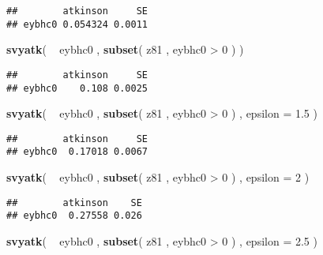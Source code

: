 \documentclass[]{book}
\newenvironment{Shaded}{\begin{snugshade}}{\end{snugshade}}
\newcommand{\KeywordTok}[1]{\textcolor[rgb]{0.13,0.29,0.53}{\textbf{{#1}}}}
\newcommand{\DataTypeTok}[1]{\textcolor[rgb]{0.13,0.29,0.53}{{#1}}}
\newcommand{\DecValTok}[1]{\textcolor[rgb]{0.00,0.00,0.81}{{#1}}}
\newcommand{\FloatTok}[1]{\textcolor[rgb]{0.00,0.00,0.81}{{#1}}}
\newcommand{\StringTok}[1]{\textcolor[rgb]{0.31,0.60,0.02}{{#1}}}
\newcommand{\NormalTok}[1]{{#1}}
\theoremstyle{definition}
\theoremstyle{definition}
\theoremstyle{remark}
\begin{document}
\begin{verbatim}
##        atkinson     SE
## eybhc0 0.054324 0.0011
\end{verbatim}

\begin{Shaded}
\begin{Highlighting}[]
\KeywordTok{svyatk}\NormalTok{( ~}\StringTok{ }\NormalTok{eybhc0 , }\KeywordTok{subset}\NormalTok{( z81 , eybhc0 >}\StringTok{ }\DecValTok{0} \NormalTok{) )}
\end{Highlighting}
\end{Shaded}

\begin{verbatim}
##        atkinson     SE
## eybhc0    0.108 0.0025
\end{verbatim}

\begin{Shaded}
\begin{Highlighting}[]
\KeywordTok{svyatk}\NormalTok{( ~}\StringTok{ }\NormalTok{eybhc0 , }\KeywordTok{subset}\NormalTok{( z81 , eybhc0 >}\StringTok{ }\DecValTok{0} \NormalTok{) , }\DataTypeTok{epsilon =} \FloatTok{1.5} \NormalTok{)}
\end{Highlighting}
\end{Shaded}

\begin{verbatim}
##        atkinson     SE
## eybhc0  0.17018 0.0067
\end{verbatim}

\begin{Shaded}
\begin{Highlighting}[]
\KeywordTok{svyatk}\NormalTok{( ~}\StringTok{ }\NormalTok{eybhc0 , }\KeywordTok{subset}\NormalTok{( z81 , eybhc0 >}\StringTok{ }\DecValTok{0} \NormalTok{) , }\DataTypeTok{epsilon =} \DecValTok{2} \NormalTok{)}
\end{Highlighting}
\end{Shaded}

\begin{verbatim}
##        atkinson    SE
## eybhc0  0.27558 0.026
\end{verbatim}

\begin{Shaded}
\begin{Highlighting}[]
\KeywordTok{svyatk}\NormalTok{( ~}\StringTok{ }\NormalTok{eybhc0 , }\KeywordTok{subset}\NormalTok{( z81 , eybhc0 >}\StringTok{ }\DecValTok{0} \NormalTok{) , }\DataTypeTok{epsilon =} \FloatTok{2.5} \NormalTok{)}
\end{Highlighting}
\end{Shaded}
\end{document}
